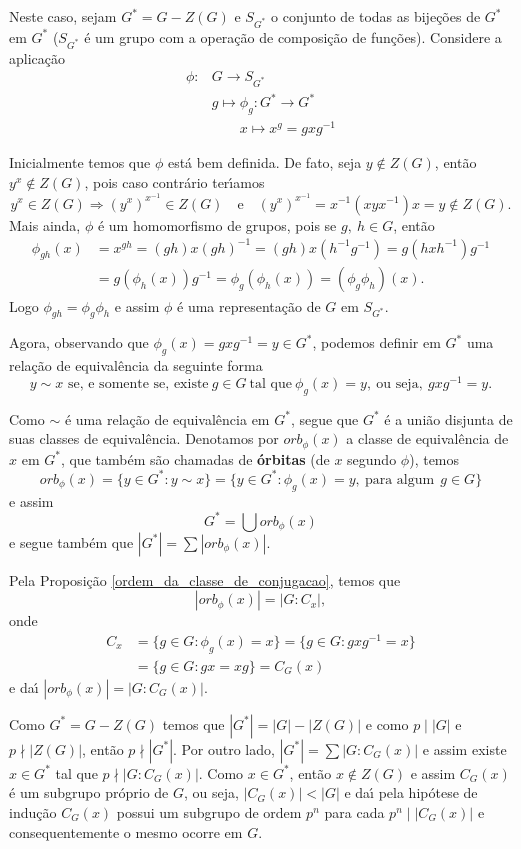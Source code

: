 \begin{prova}
Neste caso, sejam $G^* = G - Z(G)$ e $S_{G^*}$ o conjunto de todas as
bije{\c c}{\~o}es de $G^*$ em $G^*$ ($S_{G^*}$ {\'e} um grupo com a opera{\c
c}{\~a}o de composi{\c c}{\~a}o de fun{\c c}{\~o}es). Considere a
aplica{\c c}{\~a}o
\begin{align*}
\phi : & G \to S_{G^*}\\
&g \mapsto \phi_g : G^* \to G^*\\
&\qquad x \mapsto x^g = gxg^{-1}
\end{align*}

Inicialmente temos que $\phi$ est{\'a} bem definida. De fato, seja $y \notin
Z(G)$, ent{\~a}o $y^x \notin Z(G)$, pois caso contr{\'a}rio
ter{\'\i}amos
\[
y^x \in Z(G) \Rightarrow (y^x)^{x^{-1}} \in Z(G) \quad
\text{e}\quad (y^x)^{x^{-1}} = x^{-1}(xyx^{-1})x = y \notin Z(G).
\]
Mais ainda, $\phi$ {\'e} um homomorfismo de grupos, pois se $g,\ h \in G$,
ent{\~a}o 
\begin{align*}
\phi_{gh} (x) &= x^{gh} =
(gh)x(gh)^{-1} = (gh)x(h^{-1}g^{-1}) = g(hxh^{-1})g^{-1} \\&=
g(\phi_h (x))g^{-1} = \phi_g (\phi_h (x)) = (\phi_g \phi_h)(x).
\end{align*}
Logo $\phi_{gh} = \phi_g \phi_h$ e assim $\phi$ {\'e} uma representa{\c
  c}{\~a}o de $G$ em $S_{G^*}$.

Agora, observando que $\phi_g(x) = gxg^{-1} = y \in G^*$, podemos definir em
$G^*$ uma rela{\c c}{\~a}o de equival{\^e}ncia da seguinte forma
\[
y \sim x \mbox{ se, e somente se, existe}\ g \in G\ \mbox{tal que}\ \phi_g (x) = y,\
\text{ou seja},\ gxg^{-1} = y.
\]

Como $\sim$ {\'e} uma rela{\c c}{\~a}o de equival{\^e}ncia em $G^*$, segue
que $G^*$ {\'e} a uni{\~a}o disjunta de suas classes de
equival{\^e}ncia. Denotamos por $orb_\phi (x)$ a classe de equival{\^e}ncia
de $x$ em $G^*$, que tamb{\'e}m s{\~a}o chamadas de \textbf{{\'o}rbitas} (de
$x$ segundo $\phi$), temos
\[
orb_\phi (x) = \{y \in G^* : y \sim x \} = \{y
\in G^* : \phi_g (x) = y,\ \mbox{para algum}\ \ g \in G \}
\]
e assim 
\[
G^* = \bigcup orb_\phi (x)
\] e segue tamb{\'e}m que $|G^*| = \sum |orb_\phi
(x)|$.

Pela Proposi\c{c}\~ao \ref{ordem_da_classe_de_conjugacao}, temos que
\[
|orb_\phi (x)| = |G : C_x|,
\]
onde
\begin{align*}
C_x &= \{g \in G : \phi_g (x) = x \} = \{g \in G
: gxg^{-1} = x \} \\
&= \{g \in G : gx = xg \} = C_G (x)
\end{align*}
e da{\'\i} $|orb_\phi (x)| = |G : C_G (x)|$.

Como $G^* = G - Z(G)$ temos que $|G^*| = |G| - |Z(G)|$ e como $p \mid |G|$ e
$p \nmid |Z(G)|$, ent{\~a}o $p \nmid |G^*|$. Por outro lado, $|G^*| = \sum
|G : C_G(x)|$ e assim existe $x \in G^*$ tal que $p \nmid |G :
C_G(x)|$. Como $x \in G^*$, ent{\~a}o $x \notin Z(G)$ e assim $C_G(x)$ {\'e}
um subgrupo pr{\'o}prio de $G$, ou seja, $|C_G(x)| < |G|$ e da{\'\i} pela
hip{\'o}tese de indu{\c c}{\~a}o $C_G(x)$ possui um subgrupo de ordem $p^n$
para cada $p^n \mid |C_G(x)|$ e consequentemente o mesmo ocorre em $G$.
\end{prova}


